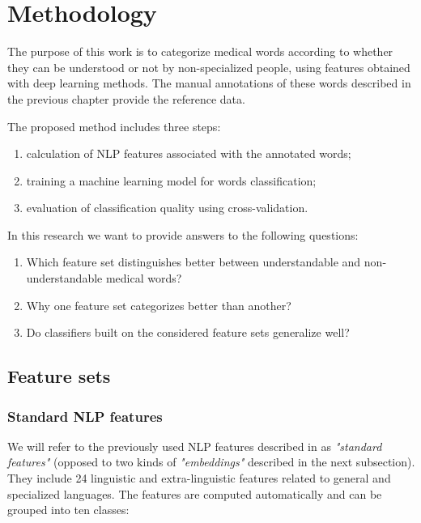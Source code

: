 \chapter{Methodology}
\label{ch:methodology}

The purpose of this work is to categorize medical words according to whether they can be understood or not by non-specialized people, using features obtained with deep learning methods. The manual annotations of these words described in the previous chapter provide the reference data. 


The proposed method includes three steps: 
\begin{enumerate}
    \item calculation of NLP features associated with the annotated words;
    \item training a machine learning model for words classification;
    \item evaluation of classification quality using cross-validation.
\end{enumerate}

In this research we want to provide answers to the following questions:
\begin{enumerate}
    \item Which feature set distinguishes better between understandable and non-understandable medical words?
    \item Why one feature set categorizes better than another?
    \item Do classifiers built on the considered feature sets generalize well? 
\end{enumerate}


\section{Feature sets}
\subsection{Standard NLP features}
\label{sec:standard-features}
We will refer to the previously used NLP features described in \citep{Grabar-PITR2014} as \textit{"standard features"} (opposed to two kinds of \textit{"embeddings"} described in the next subsection). They include 24 linguistic and extra-linguistic features related to general and specialized languages. The features are computed automatically and can be grouped into ten classes: 


